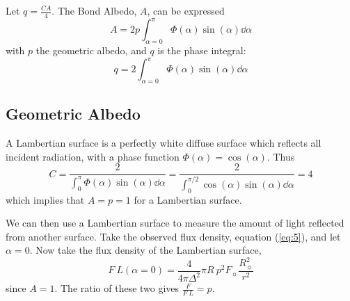Let $q = \frac{CA}{4}$. The Bond Albedo, $A$, can be expressed
\begin{equation}
  \label{eq:6}
  A = 2 p \int_{\alpha=0}^{\pi} \Phi(\alpha) \sin(\alpha) \dd{\alpha}
\end{equation}
with $p$ the geometric albedo, and $q$ is the phase integral:
\begin{equation}
  \label{eq:7}
  q = 2 \int_{\alpha=0}^{\pi} \Phi(\alpha) \sin(\alpha) \dd{\alpha}
\end{equation}

\subsection{Geometric Albedo}
\label{sec:geometric-albedo-1}

A Lambertian surface is a perfectly white diffuse surface which
reflects all incident radiation, with a phase function $\Phi(\alpha) =
\cos(\alpha)$. Thus
\begin{equation}
  \label{eq:8}
  C = \frac{2}{\int_0^{\pi} \Phi(\alpha) \sin(\alpha) \dd{\alpha}} 
    = \frac{2}{\int_0^{\pi/2} \cos(\alpha) \sin(\alpha)  \dd{\alpha} } = 4
\end{equation}
which implies that $A = p = 1$ for a Lambertian surface.

We can then use a Lambertian surface to measure the amount of light
reflected from another surface.  Take the observed flux density,
equation (\ref{eq:5}), and let $\alpha=0$. Now take the flux density
of the Lambertian surface,
\begin{equation}
  \label{eq:9}
  F~L(\alpha=0) = \frac{4}{4 \pi \Delta^2} \pi R~p^2 F_{\sun} \frac{R_{\sun}^2}{r^2} 
\end{equation}
since $A=1$. The ratio of these two gives $\frac{F}{F~L} = p$.
